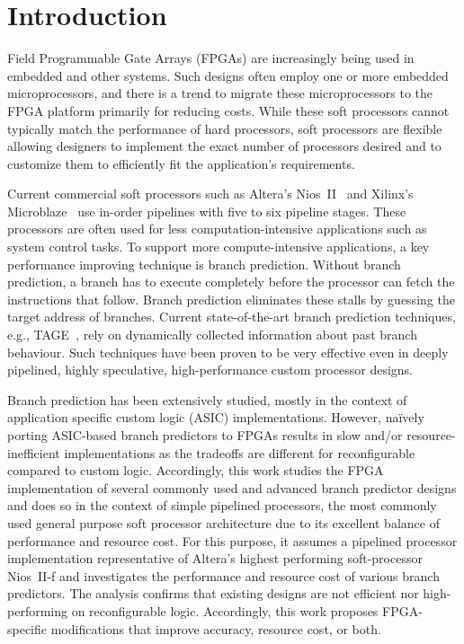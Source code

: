 \chapter{Introduction}
\label{chap:introduction}

Field Programmable Gate Arrays (FPGAs) are increasingly being used in embedded and other systems. Such designs often employ one or more embedded microprocessors, and there is a trend to migrate these microprocessors to the FPGA platform primarily for reducing costs. While these soft processors cannot typically match the performance of hard processors, soft processors are flexible allowing designers to implement the exact number of processors desired and to customize them to efficiently fit the application's requirements.

Current commercial soft processors such as Altera's Nios~II~\cite{niosii} and Xilinx's Microblaze~\cite{microblaze} use in-order pipelines with five to six pipeline stages. These processors are often used for less computation-intensive applications such as system control tasks. To support more compute-intensive applications, a key performance improving technique is branch prediction. Without branch prediction, a branch has to execute completely before the processor can fetch the instructions that follow. Branch prediction eliminates these stalls by guessing the target address of branches. Current state-of-the-art branch prediction techniques, e.g., TAGE~\cite{tage}, rely on dynamically collected information about past branch behaviour. Such techniques have been proven to be very effective even in deeply pipelined, highly speculative, high-performance custom processor designs.

Branch prediction has been extensively studied, mostly in the context of application specific custom logic (ASIC) implementations. However, na\"ively porting ASIC-based branch predictors to FPGAs results in slow and/or resource-inefficient implementations as the tradeoffs are different for reconfigurable compared to custom logic. Accordingly, this work studies the FPGA implementation of several commonly used and advanced branch predictor designs and does so in the context of simple pipelined processors, the most commonly used general purpose soft processor architecture due to its excellent balance of performance and resource cost. For this purpose, it assumes a pipelined processor implementation representative of Altera's highest performing soft-processor Nios~II-f and investigates the performance and resource cost of various branch predictors. The analysis confirms that existing designs are not efficient nor high-performing on reconfigurable logic. Accordingly, this work proposes FPGA-specific modifications that improve accuracy, resource cost, or both.


